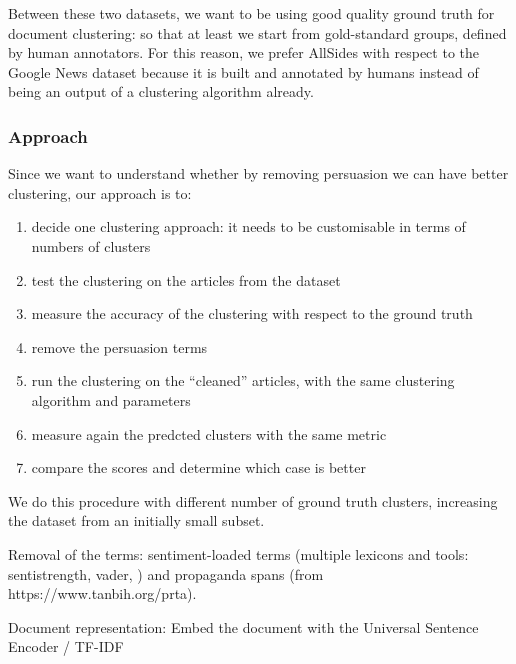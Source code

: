 Between these two datasets, we want to be using good quality ground truth for document clustering: so that at least we start from gold-standard groups, defined by human annotators. For this reason, we prefer AllSides with respect to the Google News dataset because it is built and annotated by humans instead of being an output of a clustering algorithm already.





\subsubsection{Approach}

Since we want to understand whether by removing persuasion we can have better clustering, our approach is to:
\begin{enumerate}
    \item decide one clustering approach: it needs to be customisable in terms of numbers of clusters
    \item test the clustering on the articles from the dataset
    \item measure the accuracy of the clustering with respect to the ground truth
    \item remove the persuasion terms
    \item run the clustering on the ``cleaned'' articles, with the same clustering algorithm and parameters
    \item measure again the predcted clusters with the same metric
    \item compare the scores and determine which case is better
\end{enumerate}

We do this procedure with different number of ground truth clusters, increasing the dataset from an initially small subset.



Removal of the terms: sentiment-loaded terms (multiple lexicons and tools: sentistrength, vader, )
and propaganda spans (from https://www.tanbih.org/prta).

Document representation:
Embed the document with the Universal Sentence Encoder / TF-IDF

